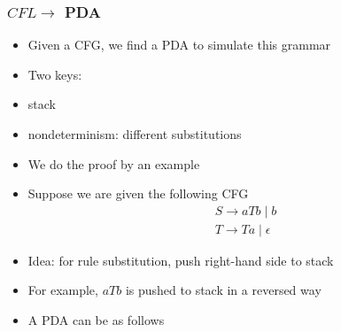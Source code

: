 \begin{frame}[allowframebreaks]
\begin{itemize}
\end{itemize}\end{frame} \begin{frame}[allowframebreaks] \frametitle{$CFL \rightarrow$ PDA}
    \begin{itemize}
    \item Given a CFG, we find a PDA to simulate this grammar
      
\item Two keys:

\item [] stack 

\item [] nondeterminism: different substitutions

  
\item We do the proof by an example
\item Suppose we are given the following
  CFG
  \begin{equation*}
    \begin{split}
      & S \rightarrow aTb \mid b\\
      & T \rightarrow Ta \mid \epsilon
    \end{split}
  \end{equation*}

\item Idea: for rule substitution, push right-hand side to stack

\item [] For example, $aTb$ is pushed to stack in a reversed way

  \item
  A PDA can be as follows


\end{itemize}
\end{frame}
